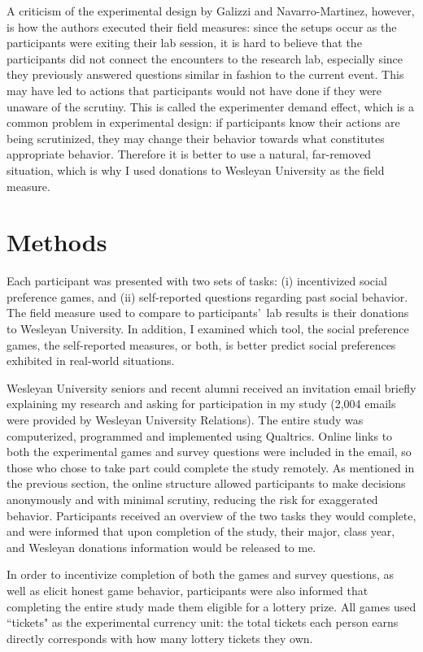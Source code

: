 \documentclass[12pt]{article}
\begin{document}
A criticism of the experimental design by Galizzi and Navarro-Martinez, however, is how the authors executed their field measures: since the setups occur as the participants were exiting their lab session, it is hard to believe that the participants did not connect the encounters to the research lab, especially since they previously answered questions similar in fashion to the current event. This may have led to actions that participants would not have done if they were unaware of the scrutiny. This is called the experimenter demand effect, which is a common problem in experimental design: if participants know their actions are being scrutinized, they may change their behavior towards what constitutes appropriate behavior. Therefore it is better to use a natural, far-removed situation, which is why I used donations to Wesleyan University as the field measure.

\section{Methods}

Each participant was presented with two sets of tasks: (i) incentivized social preference games, and (ii) self-reported questions regarding past social behavior. The field measure used to compare to participants\rq \ lab results is their donations to Wesleyan University.  In addition, I examined which tool, the social preference games, the self-reported measures, or both, is better predict social preferences exhibited in real-world situations.
 
Wesleyan University seniors and recent alumni received an invitation email briefly explaining my research and asking for participation in my study (2,004 emails were provided by Wesleyan University Relations). The entire study was computerized, programmed and implemented using Qualtrics. Online links to both the experimental games and survey questions were included in the email, so those who chose to take part could complete the study remotely. As mentioned in the previous section, the online structure allowed participants to make decisions anonymously and with minimal scrutiny, reducing the risk for exaggerated behavior. Participants received an overview of the two tasks they would complete, and were informed that upon completion of the study, their major, class year, and Wesleyan donations information would be released to me.

In order to incentivize completion of both the games and survey questions, as well as elicit honest game behavior, participants were also informed that completing the entire study made them eligible for a lottery prize. All games used ``tickets" as the experimental currency unit: the total tickets each person earns directly corresponds with how many lottery tickets they own.
\end{document}
